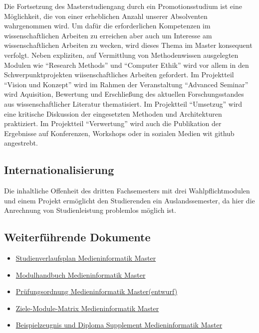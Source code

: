 Die Fortsetzung des Masterstudiengang durch ein Promotionsstudium ist
eine Möglichkeit, die von einer erheblichen Anzahl unserer Absolventen
wahrgenommen wird. Um dafür die erforderlichen Kompetenzen im
wissenschaftlichen Arbeiten zu erreichen aber auch um Interesse am
wissenschaftlichen Arbeiten zu wecken, wird dieses Thema im Master
konsequent verfolgt. Neben expliziten, auf Vermittlung von
Methodenwissen ausgelegten Modulen wie ``Research Methods'' und
``Computer Ethik'' wird vor allem in den Schwerpunktprojekten
wiisenschaftliches Arbeiten gefordert. Im Projektteil ``Vision und
Konzept'' wird im Rahmen der Veranstaltung ``Advanced Seminar'' wird
Aquisition, Bewertung und Erschließung des aktuellen Forschungsstandes
aus wissenschaftlicher Literatur thematisiert. Im Projektteil
``Umsetzug'' wird eine kritische Diskussion der eingesetzten Methoden
und Architekturen praktiziert. Im Projektteil ``Verwertung'' wird auch
die Publikation der Ergebnisse auf Konferenzen, Workshops oder in
sozialen Medien wit github angestrebt.

\subsection{Internationalisierung}\label{internationalisierung}

Die inhaltliche Offenheit des dritten Fachsemesters mit drei
Wahlpflichtmodulen und einem Projekt ermöglicht den Studierenden ein
Auslandssemester, da hier die Anrechnung von Studienleistung problemlos
möglich ist.

\subsection{Weiterführende
Dokumente}\label{weiterfuxfchrende-dokumente-4}

\begin{itemize}
\tightlist
\item
  \href{https://th-koeln.github.io/mi-2017/anhaenge/ma-studienverlaufsplan.pdf}{Studienverlaufsplan
  Medieninformatik Master}
\item
  \href{https://th-koeln.github.io/mi-2017/download/modulbeschreibungen-master.pdf}{Modulhandbuch
  Medieninformatik Master}
\item
  \href{https://th-koeln.github.io/mi-2017/anhaenge/ma-MIMPO_Entwurf_20170218.pdf}{Prüfungsordnung
  Medieninformatik Master(entwurf)}
\item
  \href{https://th-koeln.github.io/mi-2017/anhaenge/ma-Ziele-Module-Matrix-Medieninformatik-Master.pdf}{Ziele-Module-Matrix
  Medieninformatik Master}
\item
  \href{https://th-koeln.github.io/mi-2017/anhaenge/ma-zeugnis.pdf}{Beispielzeugnis und Diploma
  Supplement Medieninformatik Master}
\end{itemize}

